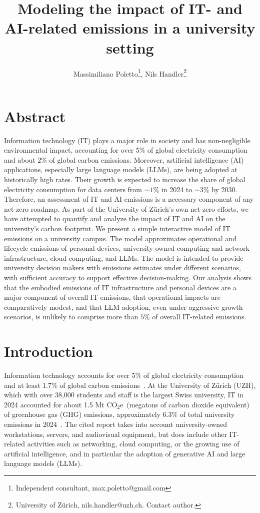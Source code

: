 \documentclass[11pt]{article}
\title{Modeling the impact of IT- and AI-related emissions in a university setting}
\author{Massimiliano Poletto\thanks{Independent consultant, max.poletto@gmail.com}, Nils Handler\thanks{University of Zürich, nils.handler@uzh.ch. Contact author.}}
\newcommand{\coe}{CO$_2$e}
\newcommand{\tcoe}{t \coe}
\begin{document}
\maketitle

\section*{Abstract}
Information technology (IT) plays a major role in society and has non-negligible environmental impact, accounting for over 5\% of global electricity consumption and about 2\% of global carbon emissions. Moreover, artificial intelligence (AI) applications, especially large language models (LLMs), are being adopted at historically high rates. Their growth is expected to increase the share of global electricity consumption for data centers from $\sim 1\%$ in 2024 to $\sim 3\%$ by 2030. Therefore, an assessment of IT and AI emissions is a necessary component of any net-zero roadmap. As part of the University of Zürich's own net-zero efforts, we have attempted to quantify and analyze the impact of IT and AI on the university's carbon footprint. We present a simple interactive model of IT emissions on a university campus. The model approximates operational and lifecycle emissions of personal devices, university-owned computing and network infrastructure, cloud computing, and LLMs. The model is intended to provide university decision makers with emissions estimates under different scenarios, with sufficient accuracy to support effective decision-making. Our analysis shows that the embodied emissions of IT infrastructure and personal devices are a major component of overall IT emissions, that operational impacts are comparatively modest, and that LLM adoption, even under aggressive growth scenarios, is unlikely to comprise more than $5\%$ of overall IT-related emissions.

\section{Introduction}

Information technology accounts for over 5\% of global electricity consumption and at least 1.7\% of global carbon emissions~\cite{wb:itu:ict}. At the University of Zürich (UZH), which with over 38,000 students and staff is the largest Swiss university, IT in 2024 accounted for about 1.5 M\tcoe\ (megatons of carbon dioxide equivalent) of greenhouse gas (GHG) emissions, approximately 6.3\% of total university emissions in 2024~\cite{uzh:sustainability:report}. The cited report takes into account university-owned workstations, servers, and audiovisual equipment, but does include other IT-related activities such as networking, cloud computing, or the growing use of artificial intelligence, and in particular the adoption of generative AI and large language models (LLMs).
\end{document}
